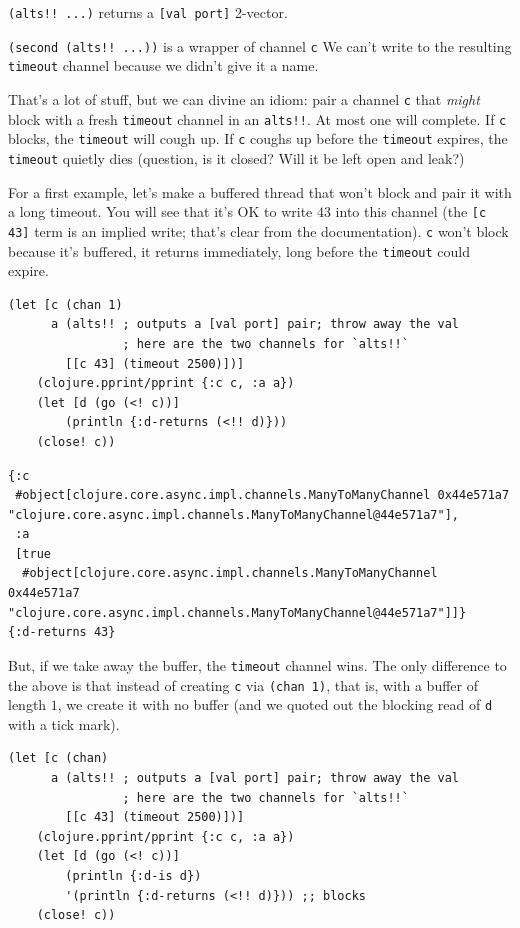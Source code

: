 \documentclass[10pt,oneside,x11names]{article}
\begin{document}
\texttt{(alts!! ...)} returns a \texttt{[val port]} 2-vector.

\texttt{(second (alts!! ...))} is a wrapper of channel \texttt{c} We can't write to
the resulting \texttt{timeout} channel because we didn't give it a name.

That's a lot of stuff, but we can divine an idiom: pair a channel \texttt{c}
that \emph{might} block with a fresh \texttt{timeout} channel in an \texttt{alts!!}. At
most one will complete. If \texttt{c} blocks, the \texttt{timeout} will cough up. If
\texttt{c} coughs up before the \texttt{timeout} expires, the \texttt{timeout} quietly dies
(question, is it closed? Will it be left open and leak?)

For a first example, let's make a buffered thread that won't block and
pair it with a long timeout. You will see that it's OK to write \(43\)
into this channel (the \texttt{[c 43]} term is an implied write; that's clear
from the documentation). \texttt{c} won't block because it's buffered, it
returns immediately, long before the \texttt{timeout} could expire.

\begin{verbatim}
(let [c (chan 1)
      a (alts!! ; outputs a [val port] pair; throw away the val
                ; here are the two channels for `alts!!`
        [[c 43] (timeout 2500)])]
    (clojure.pprint/pprint {:c c, :a a})
    (let [d (go (<! c))]
        (println {:d-returns (<!! d)}))
    (close! c))
\end{verbatim}

\begin{verbatim}
{:c
 #object[clojure.core.async.impl.channels.ManyToManyChannel 0x44e571a7 "clojure.core.async.impl.channels.ManyToManyChannel@44e571a7"],
 :a
 [true
  #object[clojure.core.async.impl.channels.ManyToManyChannel 0x44e571a7 "clojure.core.async.impl.channels.ManyToManyChannel@44e571a7"]]}
{:d-returns 43}
\end{verbatim}


But, if we take away the buffer, the \texttt{timeout} channel wins. The only
difference to the above is that instead of creating \texttt{c} via \texttt{(chan 1)},
that is, with a buffer of length \(1\), we create it with no buffer (and
we quoted out the blocking read of \texttt{d} with a tick mark).

\begin{verbatim}
(let [c (chan)
      a (alts!! ; outputs a [val port] pair; throw away the val
                ; here are the two channels for `alts!!`
        [[c 43] (timeout 2500)])]
    (clojure.pprint/pprint {:c c, :a a})
    (let [d (go (<! c))]
        (println {:d-is d})
        '(println {:d-returns (<!! d)})) ;; blocks
    (close! c))
\end{verbatim}
\end{document}
